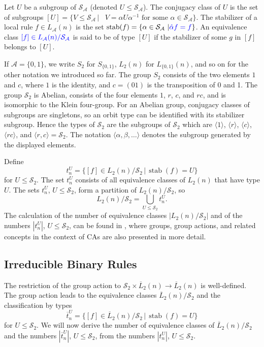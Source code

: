 \documentclass[11pt,a4paper]{article}
\newcommand{\rev}[1]{{\color{blue}#1}}
\newenvironment{revision}{\color{blue}}{}
\newcommand{\rev}[1]{{\color{black}#1}}
\newenvironment{revision}{\color{black}}{}
\newcommand{\stab}{\mathop{\mathrm{stab}}\nolimits}
\begin{document}
Let $U$ be a subgroup of $\mathcal{S}_\mathcal{A}$ (denoted $U \le \mathcal{S}_\mathcal{A}$).
The conjugacy class of $U$ is the set of subgroups
$[U] = \{ V \le \mathcal{S}_\mathcal{A} \, | \, \mbox{ $V = \alpha U \alpha^{-1}$ for some $\alpha \in \mathcal{S}_\mathcal{A}$} \}$.
The stabilizer of a local rule $f \in L_\mathcal{A}(n)$ is the set
$\stab(f) = \{ \alpha \in \mathcal{S}_\mathcal{A} \ | \rev{\hat{\alpha}f = f} \}$.
An equivalence class $\rev{[f] \in L_\mathcal{A}(n) / \mathcal{S}_\mathcal{A}}$ is said to be of
type $[U]$ if the stabilizer of some $g$ in $[f]$ belongs to $[U]$.

If $\mathcal{A} = \{0,1\}$, we write $S_2$ for $S_{\{0,1\}}$, $L_2(n)$ for $L_{\{0,1\}}(n)$, and so on for the other notation
we introduced so far.
The group $S_2$ consists of the two elements $1$ and $c$, where $1$ is the identity, and $c = (01)$ is the transposition of
0 and 1.
The group $\mathcal{S}_2$ is Abelian, consists of the four elements $1$, $r$, $c$, and $rc$, and is isomorphic to the Klein four-group.
\rev{For an Abelian group, conjugacy classes of subgroups are singletons, so an orbit type can be identified with its stabilizer subgroup.}
Hence the types of $\mathcal{S}_2$ are the subgroups of $\mathcal{S}_2$ which are $\langle 1 \rangle$, $\langle r \rangle$, $\langle c \rangle$,
$\langle rc \rangle$, and $\langle r, c \rangle = \mathcal{S}_2$.
\begin{revision}
The notation $\langle\alpha,\beta,\ldots\rangle$ denotes the subgroup generated by the displayed elements.
\end{revision}

Define
\[
t^U_n = \{ [f] \in L_2(n) / \mathcal{S}_2 \, | \, \stab(f) = U \}
\]
for $U \le \mathcal{S}_2$.
The set $t^U_n$ consists of all equivalence classes of $L_2(n)$ that have type $U$.
The sets $t^U_n$, $U \le \mathcal{S}_2$, \rev{form a partition of $L_2(n) / \mathcal{S}_2$}, so
\[
L_2(n) / \mathcal{S}_2 = \bigcup_{U \le \mathcal{S}_2} t^U_n.
\]
The calculation of the number of equivalence classes
$|L_2(n) / \mathcal{S}_2|$ and of the numbers $|t^U_n|$, $U \le \mathcal{S}_2$,
can be found in \cite{SCHALLER2025100298}, where groups, group actions, and related concepts in the context of CAs
are also presented in more detail.


\subsection{Irreducible Binary Rules}

The restriction of the group action to
$\mathcal{S}_2 \times \overline{L}_2(n) \to \overline{L}_2(n)$ is well-defined.
The group action leads to the equivalence classes $\overline{L}_2(n) / \mathcal{S}_2$
and the classification by types
\[
\overline{t}^U_n = \{ [f] \in \overline{L}_2(n) / \mathcal{S}_2 \, | \, \stab(f) = U \}
\]
 for $U \le \mathcal{S}_2$.
We will now derive the number of equivalence classes of $\overline{L}_2(n) / \mathcal{S}_2$ and the numbers
$|\overline{t}^U_n|$, $U \le \mathcal{S}_2$,
from the numbers $|t^U_n|$, $U \le \mathcal{S}_2$.
\end{document}
